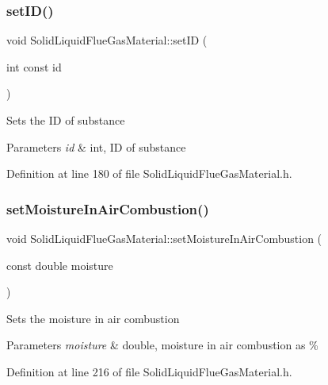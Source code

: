 \subsubsection{\texorpdfstring{set\+I\+D()}{setID()}}
{\footnotesize\ttfamily void Solid\+Liquid\+Flue\+Gas\+Material\+::set\+ID (\begin{DoxyParamCaption}\item[{int const}]{id }\end{DoxyParamCaption})\hspace{0.3cm}{\ttfamily [inline]}}

Sets the ID of substance 
\begin{DoxyParams}{Parameters}
{\em id} & int, ID of substance \\
\hline
\end{DoxyParams}


Definition at line 180 of file Solid\+Liquid\+Flue\+Gas\+Material.\+h.

\mbox{\label{class_solid_liquid_flue_gas_material_a1a5f1bd3008e78cce62edb8aca642284}} 
\subsubsection{\texorpdfstring{set\+Moisture\+In\+Air\+Combustion()}{setMoistureInAirCombustion()}}
{\footnotesize\ttfamily void Solid\+Liquid\+Flue\+Gas\+Material\+::set\+Moisture\+In\+Air\+Combustion (\begin{DoxyParamCaption}\item[{const double}]{moisture }\end{DoxyParamCaption})\hspace{0.3cm}{\ttfamily [inline]}}

Sets the moisture in air combustion 
\begin{DoxyParams}{Parameters}
{\em moisture} & double, moisture in air combustion as \% \\
\hline
\end{DoxyParams}


Definition at line 216 of file Solid\+Liquid\+Flue\+Gas\+Material.\+h.

\mbox{\label{class_solid_liquid_flue_gas_material_a54be915432c1300c4d8eaf7bf2be361f}} 
